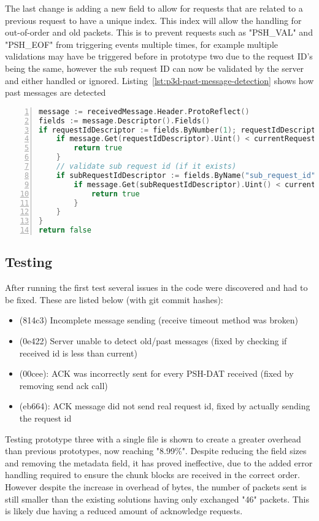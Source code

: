 The last change is adding a new field to allow for requests that are related to a previous request to have a unique index. This index will allow the handling for out-of-order and old packets. This is to prevent requests such as "PSH\_VAL" and "PSH\_EOF" from triggering events multiple times, for example multiple validations may have be triggered before in prototype two due to the request ID's being the same, however the sub request ID can now be validated by the server and either handled or ignored. Listing~\ref{lst:p3d-past-message-detection} shows how past messages are detected

\begin{lstlisting}[caption={Prototype Three Past Message Detection},label=lst:p3d-past-message-detection,breaklines,numbers=left,language=go]
message := receivedMessage.Header.ProtoReflect()
fields := message.Descriptor().Fields()
if requestIdDescriptor := fields.ByNumber(1); requestIdDescriptor != nil {
    if message.Get(requestIdDescriptor).Uint() < currentRequestID {
        return true
    }
    // validate sub request id (if it exists)
    if subRequestIdDescriptor := fields.ByName("sub_request_id"); subRequestIdDescriptor != nil && currentSubRequestID != 0 {
        if message.Get(subRequestIdDescriptor).Uint() < currentSubRequestID {
            return true
        }
    }
}
return false
\end{lstlisting}

\subsection*{Testing}
After running the first test several issues in the code were discovered and had to be fixed. These are listed below (with git commit hashes):

\begin{itemize}
    \item (814c3) Incomplete message sending (receive timeout method was broken)
    \item (0e422) Server unable to detect old/past messages (fixed by checking if received id is less than current)
    \item (00cee): ACK was incorrectly sent for every PSH-DAT received (fixed by removing send ack call)
    \item (eb664): ACK message did not send real request id, fixed by actually sending the request id
\end{itemize}

Testing prototype three with a single file is shown to create a greater overhead than previous prototypes, now reaching "8.99\%". Despite reducing the field sizes and removing the metadata field, it has proved ineffective, due to the added error handling required to ensure the chunk blocks are received in the correct order. However despite the increase in overhead of bytes, the number of packets sent is still smaller than the existing solutions having only exchanged "46" packets. This is likely due having a reduced amount of acknowledge requests.

